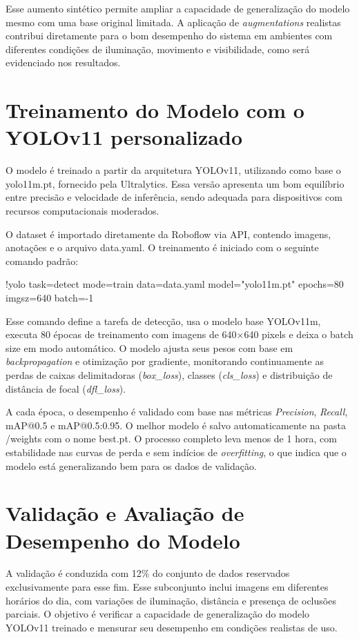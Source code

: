 Esse aumento sintético permite ampliar a capacidade de generalização do modelo mesmo com uma base original limitada. A aplicação de \textit{augmentations} realistas contribui diretamente para o bom desempenho do sistema em ambientes com diferentes condições de iluminação, movimento e visibilidade, como será evidenciado nos resultados.

\section{\textbf{Treinamento do Modelo com o YOLOv11 personalizado}}

O modelo é treinado a partir da arquitetura YOLOv11, utilizando como base o yolo11m.pt, fornecido pela Ultralytics. Essa versão apresenta um bom equilíbrio entre precisão e velocidade de inferência, sendo adequada para dispositivos com recursos computacionais moderados.

O dataset é importado diretamente da Roboflow via API, contendo imagens, anotações e o arquivo data.yaml. O treinamento é iniciado com o seguinte comando padrão:

!yolo task=detect mode=train data=data.yaml model="yolo11m.pt" epochs=80\\imgsz=640 batch=-1

Esse comando define a tarefa de detecção, usa o modelo base YOLOv11m, executa 80 épocas de treinamento com imagens de 640×640 pixels e deixa o batch size em modo automático. O modelo ajusta seus pesos com base em \textit{backpropagation} e otimização por gradiente, monitorando continuamente as perdas de caixas delimitadoras (\textit{box\_loss}), classes (\textit{cls\_loss}) e distribuição de distância de focal (\textit{dfl\_loss}).

A cada época, o desempenho é validado com base nas métricas \textit{Precision}, \textit{Recall}, mAP@0.5 e mAP@0.5:0.95. O melhor modelo é salvo automaticamente na pasta /weights com o nome best.pt. O processo completo leva menos de 1 hora, com estabilidade nas curvas de perda e sem indícios de \textit{overfitting}, o que indica que o modelo está generalizando bem para os dados de validação.

\section{\textbf{Validação e Avaliação de Desempenho do Modelo}}

A validação é conduzida com 12\% do conjunto de dados reservados exclusivamente para esse fim. Esse subconjunto inclui imagens em diferentes horários do dia, com variações de iluminação, distância e presença de oclusões parciais. O objetivo é verificar a capacidade de generalização do modelo YOLOv11 treinado e mensurar seu desempenho em condições realistas de uso.

